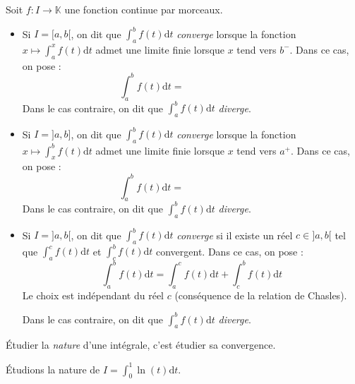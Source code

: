 \documentclass[french,11pt,twoside]{VcCours}
\newcommand{\dt}{\text{d}t}
\begin{document}
\begin{Definition}{} Soit $f : I \rightarrow \mathbb{K}$ une fonction continue par morceaux.

\begin{itemize}
\item Si $I=[a,b[$, on dit que $\int_a^b f(t)\dt$ \emph{converge} lorsque la fonction $x \mapsto \int_a^x f(t) \dt$ admet une limite finie lorsque $x$ tend vers $b^{-}$. Dans ce cas, on pose :
\[ \int_a^b f(t) \dt = \phantom{\lim_{x\to b^{-}} \int_a^x f(t)\dt} \]
Dans le cas contraire, on dit que $\int_a^b f(t)\dt$ \emph{diverge}.
\item Si $I=]a,b]$, on dit que $\int_a^b f(t)\dt$ \emph{converge} lorsque la fonction $x \mapsto \int_x^b f(t) \dt$ admet une limite finie lorsque $x$ tend vers $a^+$. Dans ce cas, on pose :
\[ \int_a^b f(t) \dt = \phantom{\lim_{x\to a^+} \int_x^b f(t)\dt} \]
Dans le cas contraire, on dit que $\int_a^b f(t)\dt$ \emph{diverge}.
\item Si $I=]a,b[$, on dit que $\int_a^b f(t)\dt$ \emph{converge} si il existe un réel $c \in ]a,b[$ tel que $\int_a^c f(t)\dt$ et $\int_c^b f(t)\dt$ convergent. Dans ce cas, on pose :
$$ \int_a^b f(t)\dt = \int_a^c f(t)\dt + \int_c^b f(t)\dt $$
Le choix est indépendant du réel $c$ (conséquence de la relation de Chasles).

Dans le cas contraire, on dit que $\int_a^b f(t)\dt$ \emph{diverge}.
\end{itemize}
\end{Definition}

\begin{Remarque}{}
Étudier la \emph{nature} d'une intégrale, c'est étudier sa convergence.
\end{Remarque}

\begin{Exemple} Étudions la nature de $I=\int_{0}^1 \ln(t) \dt$.


\newpage
\end{Exemple}
\end{document}
